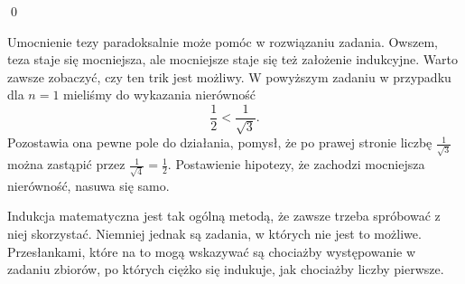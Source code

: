\qed

\noindent
Umocnienie tezy paradoksalnie może pomóc w rozwiązaniu zadania. Owszem, teza staje się mocniejsza, ale mocniejsze staje się też założenie indukcyjne. Warto zawsze zobaczyć, czy ten trik jest możliwy. W powyższym zadaniu w przypadku dla $n = 1$ mieliśmy do wykazania nierówność
\[
	\frac{1}{2} < \frac{1}{\sqrt{3}}.
\]
Pozostawia ona pewne pole do działania, pomysł, że po prawej stronie liczbę $\frac{1}{\sqrt{3}}$ można zastąpić przez $\frac{1}{\sqrt{4}} = \frac{1}{2}$. Postawienie hipotezy, że zachodzi mocniejsza nierówność, nasuwa się samo. 

\vspace{10px}

\noindent
Indukcja matematyczna jest tak ogólną metodą, że zawsze trzeba spróbować z niej skorzystać. Niemniej jednak są zadania, w których nie jest to możliwe. Przesłankami, które na to mogą wskazywać są chociażby występowanie w zadaniu zbiorów, po których ciężko się indukuje, jak chociażby liczby pierwsze. 

\vspace{10px}

